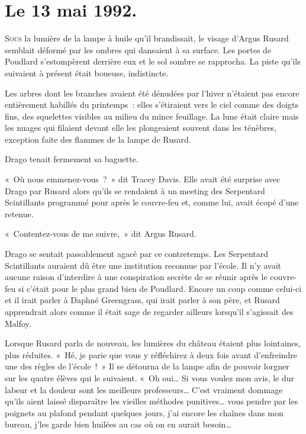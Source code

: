 
\section{Le 13 mai 1992.}

\lettrine{S}{ous} la lumière de la lampe à huile qu'il brandissait, le visage d'Argus Rusard semblait déformé par les ombres qui dansaient à sa surface.
Les portes de Poudlard s'estompèrent derrière eux et le sol sombre se rapprocha.
La piste qu'ils suivaient à présent était boueuse, indistincte.

Les arbres dont les branches avaient été dénudées par l'hiver n'étaient pas encore entièrement habillés du printemps~: elles s'étiraient vers le ciel comme des doigts fins, des squelettes visibles au milieu du mince feuillage.
La lune était claire mais les nuages qui filaient devant elle les plongeaient souvent dans les ténèbres, exception faite des flammes de la lampe de Rusard.

Drago tenait fermement sa baguette.

«~Où nous emmenez-vous~?~»
dit Tracey Davis.
Elle avait été surprise avec Drago par Rusard alors qu'ils se rendaient à un meeting des Serpentard Scintillants programmé pour après le couvre-feu et, comme lui, avait écopé d'une retenue.

«~Contentez-vous de me suivre,~» dit Argus Rusard.

Drago se sentait passablement agacé par ce contretemps.
Les Serpentard Scintillants auraient dû être une institution reconnue par l'école.
Il n'y avait aucune raison d'interdire à une conspiration secrète de se réunir après le couvre-feu si c'était pour le plus grand bien de Poudlard.
Encore un coup comme celui-ci et il irait parler à Daphné Greengrass, qui irait parler à son père, et Rusard apprendrait alors comme il était sage de regarder ailleurs lorsqu'il s'agissait des Malfoy.

Lorsque Rusard parla de nouveau, les lumières du château étaient plus lointaines, plus réduites.
«~Hé, je parie que vous y réfléchirez à deux fois avant d'enfreindre une des règles de l'école~!~»
Il se détourna de la lampe afin de pouvoir lorgner sur les quatre élèves qui le suivaient.
«~Oh oui…
Si vous voulez mon avis, le dur labeur et la douleur sont les meilleurs professeurs…
C'est vraiment dommage qu'ils aient laissé disparaître les vieilles méthodes punitives… vous pendre par les poignets au plafond pendant quelques jours, j'ai encore les chaînes dans mon bureau, j'les garde bien huilées au cas où on en aurait besoin…

